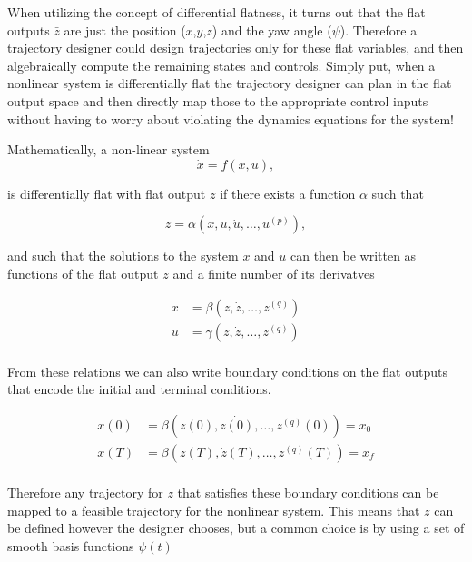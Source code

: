 ﻿\documentclass[twoside]{article}
\begin{document}
When utilizing the concept of differential flatness, it turns out that the flat outputs $\bar{z}$ are just the position ($x$,$y$,$z$) and the yaw angle ($\psi$). Therefore a trajectory designer could design trajectories only for these flat variables, and then algebraically compute the remaining states and controls. Simply put, when a nonlinear system is differentially flat the trajectory designer can plan in the flat output space and then directly map those to the appropriate control inputs without having to worry about violating the dynamics equations for the system!

Mathematically, a non-linear system
\begin{equation}
\dot{x} = f(x,u),
\end{equation}

is differentially flat with flat output $z$ if there exists a function $\alpha$ such that

\begin{equation}
z = \alpha (x,u,\dot{u},\dots,u^{(p)}),
\end{equation}

and such that the solutions to the system $x$ and $u$ can then be written as functions of the flat output $z$ and a finite number of its derivatves

\begin{equation}
\begin{split}
x &= \beta (z,\dot{z},\dots,z^{(q)}) \\
u &= \gamma (z,\dot{z},\dots,z^{(q)}) \\
\end{split}
\end{equation}

From these relations we can also write boundary conditions on the flat outputs that encode the initial and terminal conditions.

\begin{equation} \label{flatbc}
\begin{split}
x(0) &= \beta (z(0),\dot{z(0)},\dots,z^{(q)}(0)) = x_0 \\
x(T) &= \beta (z(T),\dot{z}(T),\dots,z^{(q)}(T)) = x_f \\
\end{split}
\end{equation}

Therefore any trajectory for $z$ that satisfies these boundary conditions can be mapped to a feasible trajectory for the nonlinear system. This means that $z$ can be defined however the designer chooses, but a common choice is by using a set of smooth basis functions $\psi(t)$
\end{document}
